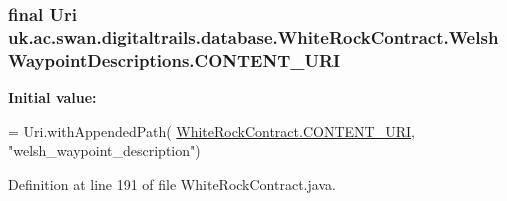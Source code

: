 \hypertarget{classuk_1_1ac_1_1swan_1_1digitaltrails_1_1database_1_1_white_rock_contract_1_1_welsh_waypoint_descriptions_a17a92013f31761a4cd010913196a57cb}{
\subsubsection[{C\+O\+N\+T\+E\+N\+T\+\_\+\+U\+R\+I}]{\setlength{\rightskip}{0pt plus 5cm}final Uri uk.\+ac.\+swan.\+digitaltrails.\+database.\+White\+Rock\+Contract.\+Welsh\+Waypoint\+Descriptions.\+C\+O\+N\+T\+E\+N\+T\+\_\+\+U\+R\+I\hspace{0.3cm}{\ttfamily [static]}}}\label{classuk_1_1ac_1_1swan_1_1digitaltrails_1_1database_1_1_white_rock_contract_1_1_welsh_waypoint_descriptions_a17a92013f31761a4cd010913196a57cb}
{\bfseries Initial value\+:}
\begin{DoxyCode}
= Uri.withAppendedPath(
                \hyperlink{classuk_1_1ac_1_1swan_1_1digitaltrails_1_1database_1_1_white_rock_contract_abfe96759bfe16773a98099536eef2306}{WhiteRockContract.CONTENT\_URI}, \textcolor{stringliteral}{"welsh\_waypoint\_description"})
\end{DoxyCode}


Definition at line 191 of file White\+Rock\+Contract.\+java.

